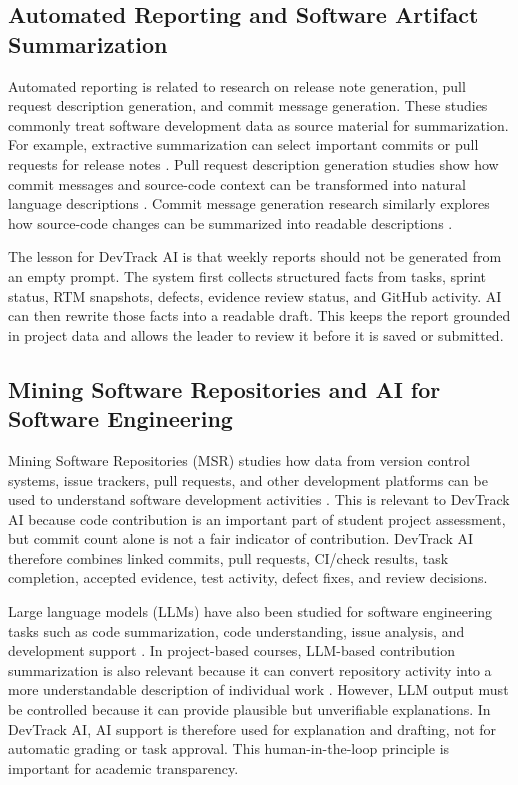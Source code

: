 \subsection{Automated Reporting and Software Artifact Summarization}

Automated reporting is related to research on release note generation, pull request
description generation, and commit message generation. These studies commonly treat
software development data as source material for summarization. For example,
extractive summarization can select important commits or pull requests for release
notes \cite{releaseNotes}. Pull request description generation studies show how
commit messages and source-code context can be transformed into natural language
descriptions \cite{prDescriptions}. Commit message generation research similarly explores
how source-code changes can be summarized into readable descriptions
\cite{commitMessages}.

The lesson for DevTrack AI is that weekly reports should not be generated from an
empty prompt. The system first collects structured facts from tasks, sprint status,
RTM snapshots, defects, evidence review status, and GitHub activity. AI can then
rewrite those facts into a readable draft. This keeps the report grounded in project
data and allows the leader to review it before it is saved or submitted.

\subsection{Mining Software Repositories and AI for Software Engineering}

Mining Software Repositories (MSR) studies how data from version control systems,
issue trackers, pull requests, and other development platforms can be used to
understand software development activities \cite{teachingMsr}. This is relevant to
DevTrack AI because code contribution is an important part of student project
assessment, but commit count alone is not a fair indicator of contribution. DevTrack
AI therefore combines linked commits, pull requests, CI/check results, task
completion, accepted evidence, test activity, defect fixes, and review decisions.

Large language models (LLMs) have also been studied for software engineering tasks
such as code summarization, code understanding, issue analysis, and development
support \cite{llmSurvey}. In project-based
courses, LLM-based contribution summarization is also relevant because it can convert
repository activity into a more understandable description of individual work
\cite{llmContribution}. However, LLM output must be controlled because it can
provide plausible but unverifiable explanations. In DevTrack AI, AI support is
therefore used for explanation and drafting, not for automatic grading or task
approval. This human-in-the-loop principle is important for academic transparency.

